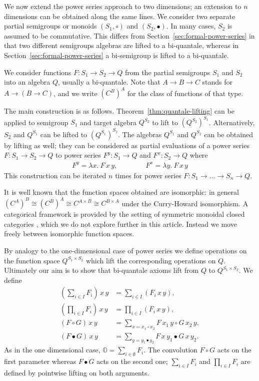 \documentclass[12pt]{article}
\theoremstyle{definition}
\newcommand{\refsec}[1]{Section~\ref{#1}}
\newcommand{\zero}{\mathbb{O}}
\begin{document}
We now extend the power series approach to two dimensions; an
extension to $n$ dimensions can be obtained along the same lines.  We
consider two separate partial semigroups or monoids $(S_1,\circ)$ and
$(S_2,\bullet)$. In many cases, $S_2$ is assumed to be
commutative. This differs from \refsec{sec:formal-power-series} in
that two different semigroups algebras are lifted to a bi-quantale,
whereas in \refsec{sec:formal-power-series} a bi-semigroup is lifted
to a bi-quantale.

We consider functions $F:S_1\to S_2\to Q$ from the partial semigroups
$S_1$ and $S_2$ into an algebra $Q$, usually a bi-quantale. Note that
$A\to B\to C$ stands for $A\to (B\to C)$, and we write $(C^B)^A$ for
the class of functions of that type.

The main construction is as
follows. Theorem~\ref{thm:quantale-lifting} can be applied to
semigroup $S_1$ and target algebra $Q^{S_2}$ to lift to
$(Q^{S_2})^{S_1}$. Alternatively, $S_2$ and $Q^{S_1}$ can be lifted to
$(Q^{S_1})^{S_2}$. The algebras $Q^{S_1}$ and $Q^{S_2}$ can be
obtained by lifting as well; they can be considered as partial
evaluations of a power series $F:S_1\to S_2\to Q$ to power series
$F^y:S_1\to Q$ and $F^x:S_2\to Q$ where 
\begin{align*}
  F^y  = \lambda x.\ F\, x\, y, \qquad\qquad F^x = \lambda y.\ F\, x\, y
\end{align*}
This construction can be iterated $n$ times for power series
$F:S_1\to\dots\to S_n\to Q$.

It is well known that the function spaces obtained are isomorphic: in
general $(C^A)^B\cong (C^B)^A\cong C^{A\times B}\cong C^{B\times A}$
under the Curry-Howard isomorphism.  A categorical framework is
provided by the setting of symmetric monoidal closed categories
\cite{Kelly}, which we do not explore further in this
article. Instead we move freely between isomorphic function spaces.

By analogy to the one-dimensional case of  power series we
define operations on the function space $Q^{S_1\times S_2}$ which lift
the corresponding operations on $Q$. Ultimately our aim is to show
that bi-quantale axioms lift from $Q$ to $Q^{S_1\times S_2}$. We
define
\begin{align*}
  (\sum_{i\in I} F_i)\, x\, y &= \sum_{i\in I} (F_i\, x\, y),\\
  (\prod_{i\in I} F_i)\, x\, y &= \prod_{i\in I} (F_i\, x\, y),\\
  (F\circ G)\, x\, y &= \sum_{x=x_1\circ x_2} F\, x_1\, y\circ G\, x_2\, y,\\
  (F \bullet G)\, x\, y &= \sum_{y=y_1\bullet y_2} F\, x\, y_1\bullet G\, x\, y_2.
\end{align*}
As in the one dimensional case, $\zero = \sum_{i\in\emptyset} F_i$.  The
convolution $F\circ G$ acts on the first parameter whereas $F\bullet
G$ acts on the second one; $\sum_{i\in I}F_i$ and $\prod_{i\in I}F_i$ are defined by
pointwise lifting on both arguments. 
\end{document}
